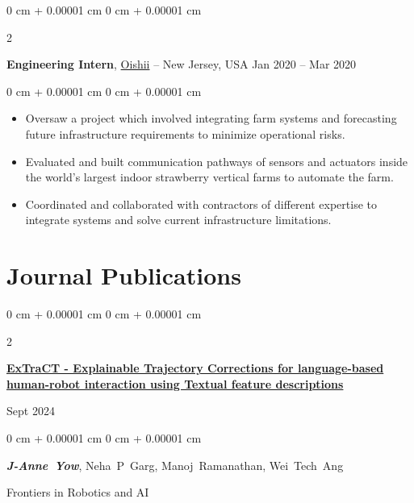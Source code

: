\documentclass[10pt, letterpaper]{article}
\newenvironment{highlights}{
    \begin{itemize}[
        topsep=0.10 cm,
        parsep=0.10 cm,
        partopsep=0pt,
        itemsep=0pt,
        leftmargin=0 cm + 10pt
    ]
}{
    \end{itemize}
} %
\newenvironment{onecolentry}{
    \begin{adjustwidth}{
        0 cm + 0.00001 cm
    }{
        0 cm + 0.00001 cm
    }
}{
    \end{adjustwidth}
} %
\newenvironment{twocolentry}[2][]{
    \onecolentry
    \def\secondColumn{#2}
    \setcolumnwidth{\fill, 4.5 cm}
    \begin{paracol}{2}
}{
    \switchcolumn \raggedleft \secondColumn
    \end{paracol}
    \endonecolentry
} %
\begin{document}
        \vspace{0.2 cm}

        \begin{twocolentry}{
            Jan 2020 – Mar 2020
        }
            \textbf{Engineering Intern}, \href{https://oishii.com/}{Oishii} -- New Jersey, USA\end{twocolentry}

        \vspace{0.10 cm}
        \begin{onecolentry}
            \begin{highlights}
                \item Oversaw a project which involved integrating farm systems and forecasting future infrastructure requirements to minimize operational risks.
                \item Evaluated and built communication pathways of sensors and actuators inside the world's largest indoor strawberry vertical farms to automate the farm.
                \item Coordinated and collaborated with contractors of different expertise to integrate systems and solve current infrastructure limitations.
            \end{highlights}
        \end{onecolentry}



    
    \section{Journal Publications}



        
        \begin{samepage}
            \begin{twocolentry}{
                Sept 2024
            }
                \textbf{\href{https://www.frontiersin.org/journals/robotics-and-ai/articles/10.3389/frobt.2024.1345693/full}{ExTraCT - Explainable Trajectory Corrections for language-based human-robot interaction using Textual feature descriptions}}
            \end{twocolentry}

            \vspace{0.10 cm}
            
            \begin{onecolentry}
                \mbox{\textbf{\textit{J-Anne Yow}}}, \mbox{Neha P Garg}, \mbox{Manoj Ramanathan}, \mbox{Wei Tech Ang}

                \vspace{0.10 cm}
                
        Frontiers in Robotics and AI\end{onecolentry}
        \end{samepage}
\end{document}
